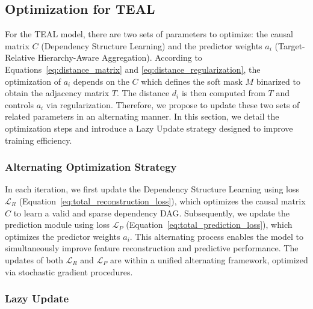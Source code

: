 \documentclass[conference]{IEEEtran}
\newcommand{\icde}[1]{{\color{black}#1}}
\newcommand{\rlend}[1]{{\color{black}#1}}
\newcommand{\syadd}[1]{{\color{black}#1}}
\newcommand{\syfix}[1]{{\color{black}#1}}
\newcommand{\syic}[1]{{\color{black}#1}}
\newcommand*{\ourmodel}{TEAL}
\begin{document}
\subsection{Optimization for \ourmodel{}}
\rlend{
For the \ourmodel{} model, there are two sets of parameters to optimize: the causal matrix $C$ (\syic{Dependency Structure Learning}) and the predictor weights $a_i$ (\syic{Target-Relative Hierarchy-Aware Aggregation}). 
According to Equations~\ref{eq:distance_matrix} and \ref{eq:distance_regularization}, the optimization of $a_i$ depends on the $C$
\syfix{
which defines the soft mask $M$ binarized to obtain the adjacency matrix $T$. 
The distance $d_i$ is then computed from $T$ and controls $a_i$ via regularization.
} 
Therefore, we propose to update these two sets of related parameters in an alternating manner.
}
\syadd{
In this section, we detail the optimization steps and introduce a Lazy Update strategy designed to improve training efficiency.
}

\subsubsection{Alternating Optimization Strategy}
In each iteration, we first update the \syic{Dependency Structure Learning} using loss $\mathcal{L}_R$ (Equation~\eqref{eq:total_reconstruction_loss}), which optimizes the causal matrix $C$ to learn a valid and sparse \syic{dependency} DAG. 
Subsequently, we update the prediction module using loss $\mathcal{L}_P$ (Equation~\eqref{eq:total_prediction_loss}), which optimizes the predictor weights $a_i$.  
\syadd{This alternating process enables the model to simultaneously improve feature reconstruction and predictive performance.}
\icde{
The updates of both $\mathcal{L}_R$ and $\mathcal{L}_P$ are within a unified alternating framework, optimized via stochastic gradient procedures.
}

\subsubsection{Lazy Update}
\end{document}
